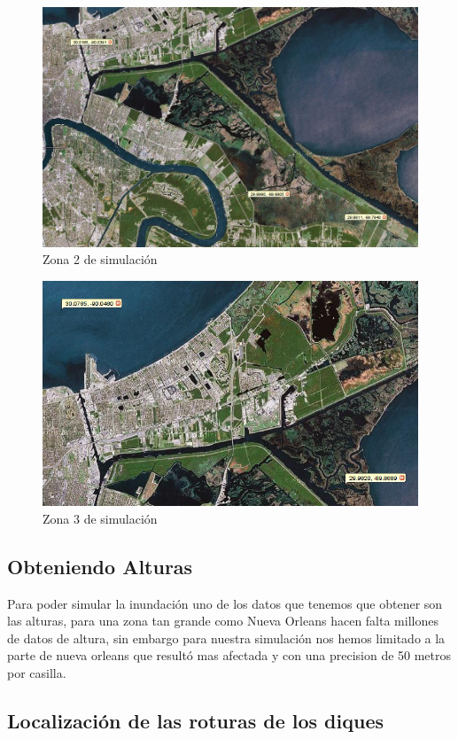 \begin{figure}[H]
 \centering
 \includegraphics[width=120mm]{figuras/cap6/NOarea3.png}
 \caption{Zona 2 de simulación}
\end{figure}

\begin{figure}[H]
 \centering
 \includegraphics[width=120mm]{figuras/cap6/NOarea4.png}
 \caption{Zona 3 de simulación}
\end{figure}


\subsection*{Obteniendo Alturas}

Para poder simular la inundación uno de los datos que tenemos que obtener son
las alturas, para una zona tan grande como Nueva Orleans hacen falta millones
de datos de altura, sin embargo para nuestra simulación nos hemos limitado a la
parte de nueva orleans que resultó mas afectada y con una precision de 50
metros por casilla.

\subsection*{Localización de las roturas de los diques}

